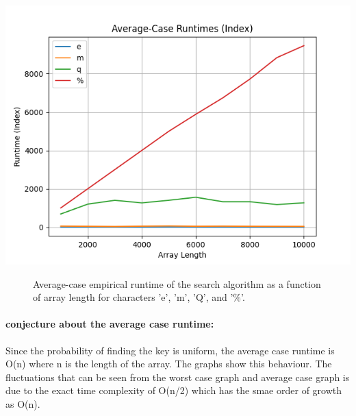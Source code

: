 \documentclass{article}
\begin{document}
\includegraphics[width=\textwidth]{average-case_runtimes_(index).png}
\begin{figure}
    \caption{Average-case empirical runtime of the search algorithm as a function of array length for characters 'e', 'm', 'Q', and '\%'.}
\end{figure}

\paragraph*{conjecture about the average case runtime: }
Since the probability of finding the key is uniform, the average case runtime is O(n) where n is the length of the array. The graphs show this behaviour. The fluctuations that can be seen from the worst case graph and average case graph is due to the exact time complexity of O(n/2) which has the smae order of growth as O(n).
\end{document}
